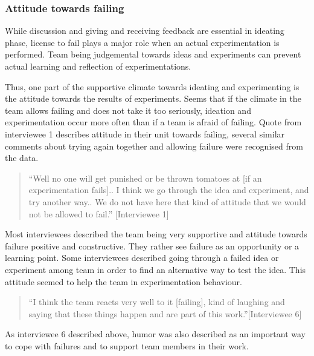 \subsubsection{Attitude towards failing}
While discussion and giving and receiving feedback are essential in ideating phase, license to fail plays a major role when an actual experimentation is performed. Team being judgemental towards ideas and experiments can prevent actual learning and reflection of experimentations.  

Thus, one part of the supportive climate towards ideating and experimenting is the attitude towards the results of experiments. Seems that if the climate in the team allows failing and does not take it too seriously, ideation and experimentation occur more often than if a team is afraid of failing. Quote from interviewee 1 describes attitude in their unit towards failing, several similar comments about trying again together and allowing failure were recognised from the data. 
\begin{quote}
``Well no one will get punished or be thrown tomatoes at [if an experimentation fails].. I think we go through the idea and experiment, and try another way.. We do not have here that kind of attitude that we would not be allowed to fail.'' [Interviewee 1]
\end{quote}

Most interviewees described the team being very supportive and attitude towards failure positive and constructive. They rather see failure as an opportunity or a learning point. Some interviewees described going through a failed idea or experiment among team in order to find an alternative way to test the idea. This attitude seemed to help the team in experimentation behaviour. 
\begin{quote}
``I think the team reacts very well to it [failing], kind of laughing and saying that these things happen and are part of this work.''[Interviewee 6]
\end{quote}
As interviewee 6 described above, humor was also described as an important way to cope with failures and to support team members in their work. 

